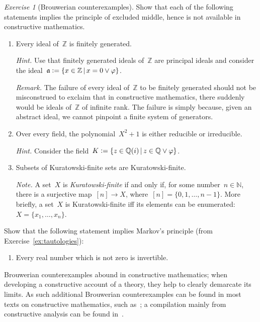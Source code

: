 \documentclass[10pt,reqno,a4paper,openany]{amsbook}
\theoremstyle{definition}
\theoremstyle{plain}
\theoremstyle{remark}
\newcommand{\ZZ}{\mathbb{Z}}
\newcommand{\NN}{\mathbb{N}}
\newcommand{\QQ}{\mathbb{Q}}
\newcommand{\aaa}{\mathfrak{a}}
\newcommand{\?}{\,{:}\,}
\renewcommand{\_}{\mathpunct{.}\,}
\newcommand{\defeq}{\vcentcolon=}
\newtheorem{exercise}{Exercise}[chapter]
\begin{document}
\begin{exercise}[Brouwerian counterexamples]
Show that each of the following statements implies the principle of excluded middle,
hence is not available in constructive mathematics.
\begin{enumerate}
\item Every ideal of~$\ZZ$ is finitely generated.

{\noindent\scriptsize\emph{Hint.} Use that finitely generated ideals of~$\ZZ$
are principal ideals and consider the ideal~$\aaa \defeq \{ x \in \ZZ
\,|\, x = 0 \vee \varphi \}$.\par}

{\noindent\scriptsize\emph{Remark.} The failure of every ideal of~$\ZZ$ to be
finitely generated should not be misconstrued to exclaim that in constructive
mathematics, there suddenly would be ideals of~$\ZZ$ of infinite rank. The
failure is simply because, given an abstract ideal, we cannot pinpoint a finite
system of generators.\par}

\item Over every field, the polynomial~$X^2 + 1$ is either reducible or
irreducible.

{\noindent\scriptsize\emph{Hint.} Consider the field~$K \defeq \{ z \in \QQ(i)
\,|\, z \in \QQ \vee \varphi \}$.\par}

\item Subsets of Kuratowski-finite sets are Kuratowski-finite.

{\noindent\scriptsize\emph{Note.} A set~$X$ is \emph{Kuratowski-finite} if and
only if, for some number~$n \in \NN$, there is a surjective map~$[n] \to X$,
where~$[n] = \{ 0,1,\ldots,n-1 \}$. More briefly, a set~$X$ is
Kuratowski-finite iff its elements can be enumerated: $X = \{x_1,\ldots,x_n \}$.\par}
\end{enumerate}
Show that the following statement implies Markov's principle (from
Exercise~\ref{ex:tautologies}):
\begin{enumerate}
\addtocounter{enumi}{3}
\item Every real number which is not zero is invertible.
\end{enumerate}
\noindent
Brouwerian counterexamples abound in constructive mathematics; when developing
a constructive account of a theory, they help to clearly demarcate its limits.
As such additional Brouwerian counterexamples can be found in most texts on
constructive mathematics, such
as~\cite{mines-richman-ruitenburg:constructive-algebra}; a compilation mainly
from constructive analysis can be found
in~\cite{mandelkern:brouwerian-counterexamples}.
\end{exercise}
\end{document}
